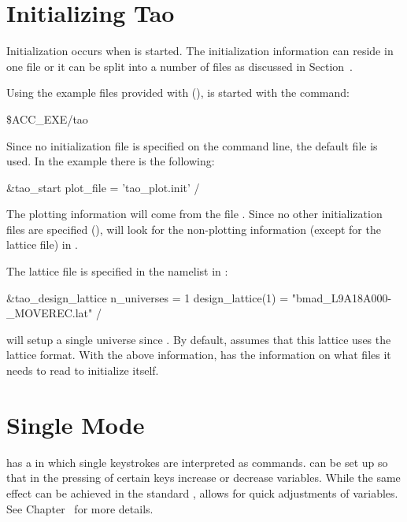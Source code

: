 \section{Initializing Tao}
\label{s:initializing}

Initialization occurs when \tao is started. The initialization
information can reside in one file or it can be split into a number of
files as discussed in Section~.

Using the example files provided with \tao (), \tao
is started with the command:
\begin{example}
  \$ACC_EXE/tao
\end{example}
Since no initialization file is specified on the command line, the
default file  is used. In the example  there
is the following:
\begin{example}
  &tao_start
    plot_file = 'tao_plot.init'
  /
\end{example}
The plotting information will
come from the file . Since no other initialization
files are specified (), \tao will look for the
non-plotting information (except for the lattice file) in .

The lattice file is specified in the  namelist
in :
\begin{example}
  &tao_design_lattice
    n_universes = 1
    design_lattice(1) = "bmad_L9A18A000-_MOVEREC.lat"
  /
\end{example}
\tao will setup a single universe since .
By default, \tao assumes that this lattice uses the \bmad lattice
format.  With the above information, \tao has the information on what
files it needs to read to initialize itself.

\section{Single Mode}
\label{s:single.mode}

\tao has a  in which single keystrokes are interpreted
as commands. \tao can be set up so that in  the
pressing of certain keys increase or decrease variables. While the
same effect can be achieved in the standard ,  allows for quick adjustments of variables. See
Chapter~ for more details.


